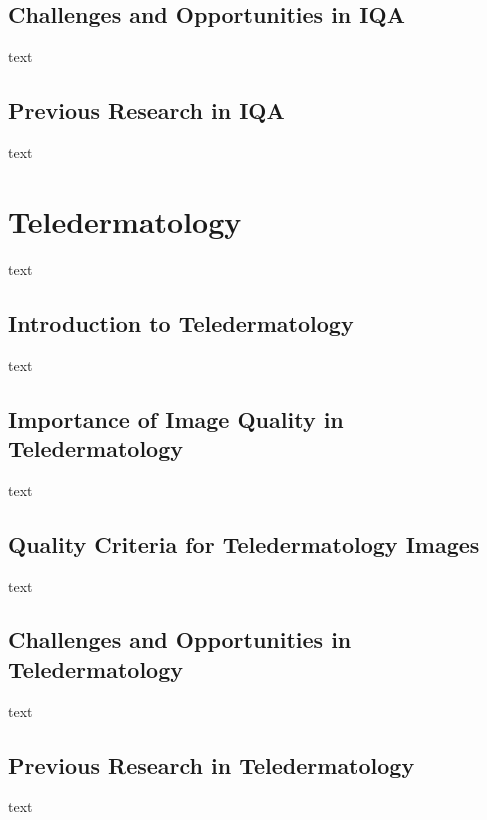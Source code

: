 \subsection{Challenges and Opportunities in IQA}
\label{sub:ChallengesOpportunitiesIQA}
text \par
\vspace{\baselineskip}
\noindent

\subsection{Previous Research in IQA}
\label{sub:PreviousResearchIQA}
text \par
\vspace{\baselineskip}
\noindent



\section{Teledermatology}
\label{sec:Teledermatology}
text \par
\vspace{\baselineskip}
\noindent

\subsection{Introduction to Teledermatology}
\label{sub:IntroductionTeledermatology}
text \par
\vspace{\baselineskip}
\noindent

\subsection{Importance of Image Quality in Teledermatology}
\label{sub:ImportanceIQA_Teledermatology}
text \par
\vspace{\baselineskip}
\noindent

\subsection{Quality Criteria for Teledermatology Images}
\label{sub:QualityCriteriaTeledermatology}
text \par
\vspace{\baselineskip}
\noindent

\subsection{Challenges and Opportunities in Teledermatology}
\label{sub:ChallengesOpportunitiesTeledermatology}
text \par
\vspace{\baselineskip}
\noindent

\subsection{Previous Research in Teledermatology}
\label{sub:PreviousResearchTeledermatology}
text \par
\vspace{\baselineskip}
\noindent